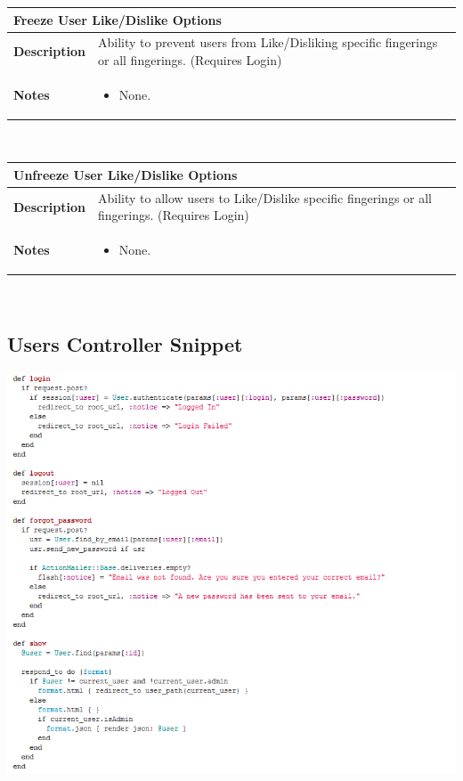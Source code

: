 \documentclass[12pt,english]{article}
\providecommand{\tabularnewline}{\\}
\providecommand{\tabularnewline}{\\}
\begin{document}
\begin{tabular}{|p{3cm}|p{13cm}|}
\hline 
\multicolumn{2}{|l|}{\textbf{Freeze User Like/Dislike Options}}\tabularnewline
\hline 
\textbf{Description}  & Ability to prevent users from Like/Disliking specific fingerings or
all fingerings. (Requires Login) \tabularnewline
\hline 
\textbf{Notes}  & \begin{itemize}
\item None. \end{itemize}
\tabularnewline
\hline 
\end{tabular}\\[0.5cm] %
\begin{tabular}{|p{3cm}|p{13cm}|}
\hline 
\multicolumn{2}{|l|}{\textbf{Unfreeze User Like/Dislike Options}}\tabularnewline
\hline 
\textbf{Description}  & Ability to allow users to Like/Dislike specific fingerings or all
fingerings. (Requires Login) \tabularnewline
\hline 
\textbf{Notes}  & \begin{itemize}
\item None. \end{itemize}
\tabularnewline
\hline 
\end{tabular}\\[0.5cm]


\subsection{Users Controller Snippet}

\includegraphics[scale=0.7]{users_controller}
\end{document}
